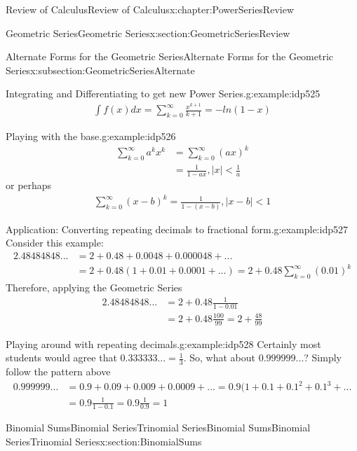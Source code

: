 \documentclass[oneside,10pt,]{book}
\numberwithin{equation}{section}
\newcommand{\lt}{<}
\begin{document}
\begin{chapterptx}{Review of Calculus}{}{Review of Calculus}{}{}{x:chapter:PowerSeriesReview}
\begin{sectionptx}{Geometric Series}{}{Geometric Series}{}{}{x:section:GeometricSeriesReview}
\begin{subsectionptx}{Alternate Forms for the Geometric Series}{}{Alternate Forms for the Geometric Series}{}{}{x:subsection:GeometricSeriesAlternate}
\begin{example}{Integrating and Differentiating to get new Power Series.}{g:example:idp525}
\begin{gather*}
\int f(x) dx = \sum_{k=0}^{\infty} {\frac{x^{k+1}}{k+1}} = -ln(1-x)
\end{gather*}
\end{example}
\begin{example}{Playing with the base.}{g:example:idp526}%
%
\begin{align*}
\sum_{k=0}^{\infty} {a^k x^k} & = \sum_{k=0}^{\infty} {(ax)^k}\\
& = \frac{1}{1-ax}, |x| \lt \frac{1}{a}
\end{align*}
or perhaps%
%
\begin{gather*}
\sum_{k=0}^{\infty} {(x-b)^k} = \frac{1}{1-(x-b)}, |x-b| \lt 1
\end{gather*}
\end{example}
\begin{example}{Application: Converting repeating decimals to fractional form.}{g:example:idp527}%
Consider this example:%
%
\begin{align*}
2.48484848... & = 2 + 0.48 + 0.0048 + 0.000048 + ...\\
&  = 2 + 0.48(1 + 0.01 + 0.0001 + ... ) = 2 + 0.48 \sum_{k=0}^\infty (0.01)^k
\end{align*}
Therefore, applying the Geometric Series%
%
\begin{align*}
2.48484848... & = 2 + 0.48 \frac{1}{1-0.01} \\
& = 2 + 0.48 \frac{100}{99} = 2 + \frac{48}{99} 
\end{align*}
\end{example}
\begin{example}{Playing around with repeating decimals.}{g:example:idp528}%
Certainly most students would agree that \(0.333333... = \frac{1}{3} \). So, what about \(0.999999...\)? Simply follow the pattern above%
%
\begin{align*}
0.999999... & = 0.9 + 0.09 + 0.009 + 0.0009 + ... = 0.9(1 + 0.1 + 0.1^2 + 0.1^3 + ...\\
& = 0.9 \frac{1}{1-0.1} = 0.9 \frac{1}{0.9} = 1 
\end{align*}
\end{example}
\end{subsectionptx}
\end{sectionptx}
%
%
\typeout{************************************************}
\typeout{************************************************}
%
\begin{sectionptx}{Binomial SumsBinomial SeriesTrinomial Series}{}{Binomial SumsBinomial SeriesTrinomial Series}{}{}{x:section:BinomialSums}

\end{sectionptx}
\end{chapterptx}
\end{document}

